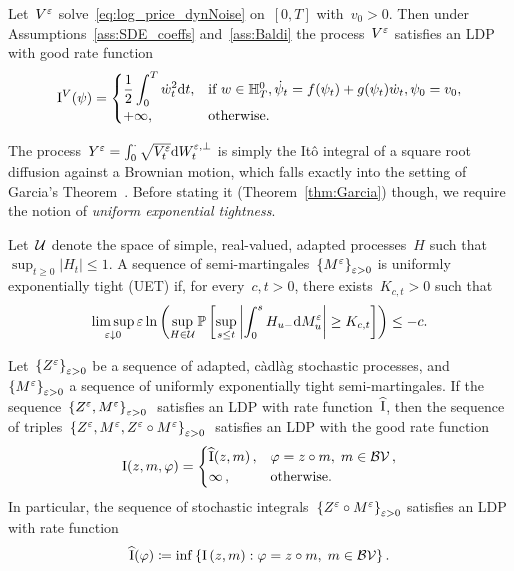 \begin{theorem}
\label{thm:Baldi}
Let~$V^{\varepsilon}$ solve~\eqref{eq:log_price_dynNoise} on~$[0, T]$ with~$v_0>0$. Then under Assumptions~\ref{ass:SDE_coeffs} and~\ref{ass:Baldi} the process~$V^\varepsilon$ satisfies an LDP with good rate function
\[
\mathrm{I}^{V}(\psi)= \begin{cases}
\displaystyle \frac{1}{2} \int_{0}^{T} \dot{w}_t^2 \mathrm{d} t, 
& \text{if } w\in\mathbb{H}^0_T, \dot{\psi}_t = f(\psi_t) + g(\psi_t)\dot{w}_t, \psi_0 = v_0, \\ 
+\infty, & \text{otherwise}.
\end{cases}
\]
\end{theorem}
The process~$Y^\varepsilon=\int_0^\cdot \sqrt{V^\varepsilon_{t}} \mathrm{d} W^{\varepsilon,\perp}_{t}$ is simply the It{\^o} integral of a square root diffusion against a Brownian motion, which falls exactly into the setting of Garcia's Theorem~\cite{Garcia2007AIntegrals}. 
Before stating it (Theorem~\ref{thm:Garcia}) though, 
we require the notion of \textit{uniform exponential tightness}.
\begin{definition}\label{def:UET}
Let~$\mathcal{U}$ denote the space of simple, real-valued, adapted processes~$H$ such that~$\sup _{t \geq 0}\left|H_{t}\right| \leq 1$. A sequence of semi-martingales~$\left\{M^{\varepsilon}\right\}_{\varepsilon > 0}$ is uniformly exponentially tight (UET) if, for every~$c, t>0$, there exists~$K_{c, t}>0$ such that
\[
\limsup _{\varepsilon \downarrow 0} \varepsilon \ln \left(\sup _{H \in \mathcal{U}} \mathbb{P}\left[\sup _{s \leq t}\left|\int_{0}^{s} H_{u-} \mathrm{d} M_{u}^{\varepsilon}\right| \geq K_{c, t}\right]\right) \leq-c .
\]
\end{definition}
\begin{theorem}\label{thm:Garcia}
Let~$\left\{Z^{\varepsilon}\right\}_{\varepsilon > 0}$ be a sequence of adapted, c\`adl\`ag stochastic processes, and~$\left\{M^{\varepsilon}\right\}_{\varepsilon > 0}$ a sequence of uniformly exponentially tight semi-martingales. If the sequence~$\left\{Z^{\varepsilon}, M^{\varepsilon}\right\}_{\varepsilon > 0}~$ satisfies an LDP with rate function~$\widehat{\mathrm{I}}$, then the sequence of triples~$\left\{Z^{\varepsilon}, M^{\varepsilon}, Z^\varepsilon\circ M^\varepsilon\right\}_{\varepsilon > 0}~$ satisfies an LDP with the good rate function
\[
\mathrm{I}(z,m,\varphi)=\begin{cases}
\widehat{\mathrm{I}}(z,m)\,, & \varphi = z \circ m,\; m \in \mathcal{BV}\,, \\
\infty\,, & \text{otherwise}.
\end{cases}
\]
In particular, the sequence of stochastic integrals~$\left\{Z^{\varepsilon} \circ M^{\varepsilon}\right\}_{\varepsilon > 0}$ satisfies an LDP with rate function~$$\widehat{\mathrm{I}}(\varphi)\coloneqq\inf \left\{\mathrm{I}\left(z,m\right): \varphi=z \circ m,\; m \in \mathcal{BV}\right\}.$$
\end{theorem}
